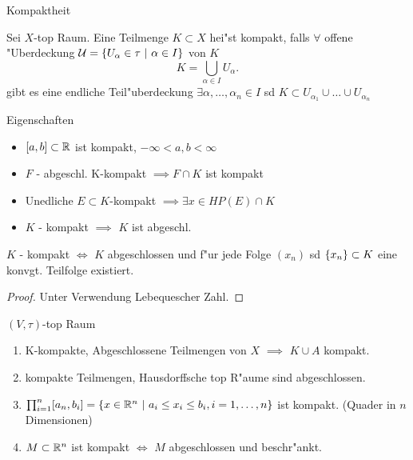 \documentclass[class=article, crop=false]{standalone}
\begin{document}
\begin{zettel}{Kompaktheit}
\begin{definition}
    Sei $X$-top Raum. Eine Teilmenge $K \subset  X$ hei"st kompakt, falls $\forall $ offene "Uberdeckung $\mathcal{U} =\set{U_{\alpha}\in  \tau}{\alpha \in I}$ von $K$ 
\[
    K = \bigcup_{\alpha \in  I} U_\alpha
.\]
gibt es eine endliche Teil"uberdeckung $\exists \alpha, \dots, \alpha_n \in  I$ sd $K \subset  U_{\alpha_{1}} \cup \dots \cup U_{\alpha_n}$ 
\end{definition}

\begin{remark}
    Eigenschaften
\begin{itemize}
    \item $[a,b] \subset \mathbb{R}$ ist kompakt,  $-\infty < a,b < \infty $
    \item $F$ - abgeschl. K-kompakt $\implies F \cap K$ ist kompakt
    \item Unedliche $E \subset K $-kompakt  $\implies \exists x \in  HP (E) \cap K$ 
    \item $K$ - kompakt $\implies $ $K$ ist abgeschl.
\end{itemize}
\end{remark}

\begin{theorem}
$K$ - kompakt $\iff  $  $K$ abgeschlossen und f"ur jede Folge $(x_n )$ sd $\set{x_n } \subset K$ eine konvgt. Teilfolge existiert.
\begin{proof}
    Unter Verwendung Lebequescher Zahl.
\end{proof}
\end{theorem}
    \begin{theorem}
    $(V,\tau)$-top Raum
    \begin{enumerate}
        \item K-kompakte, Abgeschlossene Teilmengen von $X$ $\implies $ $K \cup A$ kompakt. 
        \item kompakte Teilmengen, Hausdorffsche top R"aume sind abgeschlossen.
    \item $\prod_{i=1}^n [a_n,b_i] = \set{x \in  \R ^{n}}{ a_i \leq x_i \leq  b_i, i=1,\dots,n}$ ist kompakt. (Quader in $n$ Dimensionen)
    \item $M \subset  \mathbb{R} ^n$ ist kompakt $\iff $ $M$ abgeschlossen und beschr"ankt.
    \end{enumerate}
    \end{theorem}


\end{zettel}
\end{document}
